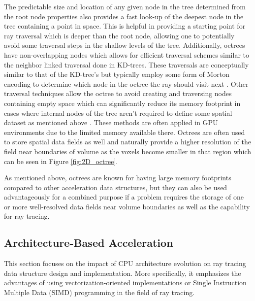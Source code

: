The predictable size and location of any given node in the tree determined from
the root node properties also provides a fast look-up of the deepest node in the
tree containing a point in space. This is helpful in providing a starting point
for ray traversal which is deeper than the root node, allowing one to
potentially avoid some traversal steps in the shallow levels of the
tree. Additionally, octrees have non-overlapping nodes which allows for
efficient traversal schemes similar to the neighbor linked traversal done in
KD-trees. These traversals are conceptually similar to that of the KD-tree's but
typically employ some form of Morton encoding to determine which node in the
octree the ray should visit next \cite{Revelles_2000}. Other traversal
techniques allow the octree to avoid creating and traversing nodes containing
empty space which can significantly reduce its memory footprint in cases where
internal nodes of the tree aren't required to define some spatial dataset as
mentioned above \cite{Samet_1989}. These methods are often applied in GPU
environments due to the limited memory available there. Octrees are often used
to store spatial data fields as well and naturally provide a higher resolution
of the field near boundaries of volume as the voxels become smaller in that
region which can be seen in Figure \ref{fig:2D_octree}.

As mentioned above, octrees are known for having large memory footprints
compared to other acceleration data structures, but they can also be used
advantageously for a combined purpose if a problem requires the storage of one
or more well-resolved data fields near volume boundaries as well as the
capability for ray tracing.

\subsection{Architecture-Based Acceleration}%
\label{subsec:arch}

This section focuses on the impact of CPU architecture evolution on ray tracing
data structure design and implementation. More specifically, it emphasizes the
advantages of using vectorization-oriented implementations or Single Instruction
Multiple Data (SIMD) programming in the field of ray tracing.


